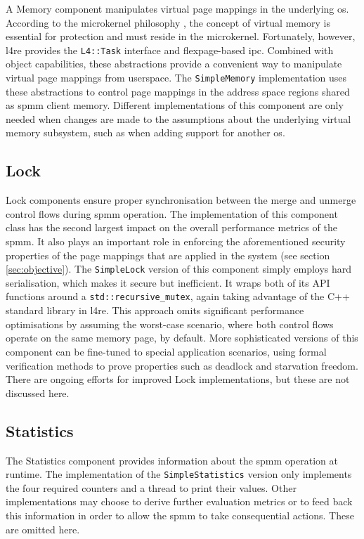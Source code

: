 A Memory component manipulates virtual page mappings in the underlying \ac{os}.
According to the microkernel philosophy \cite{liedtke1995}, the concept of virtual memory is essential for protection and must reside in the microkernel.
Fortunately, however, \ac{l4re} provides the \texttt{L4::Task} interface and flexpage-based \ac{ipc}.
Combined with object capabilities, these abstractions provide a convenient way to manipulate virtual page mappings from userspace.
The \texttt{SimpleMemory} implementation uses these abstractions to control page mappings in the address space regions shared as \ac{spmm} client memory.
Different implementations of this component are only needed when changes are made to the assumptions about the underlying virtual memory subsystem, such as when adding support for another \ac{os}.

\subsection*{Lock}
\label{subsec:lock}

Lock components ensure proper synchronisation between the merge and unmerge control flows during \ac{spmm} operation.
The implementation of this component class has the second largest impact on the overall performance metrics of the \ac{spmm}.
It also plays an important role in enforcing the aforementioned security properties of the page mappings that are applied in the system (see section \ref{sec:objective}).
The \texttt{SimpleLock} version of this component simply employs hard serialisation, which makes it secure but inefficient.
It wraps both of its API functions around a \texttt{std::recursive\_mutex}, again taking advantage of the C++ standard library in \ac{l4re}.
This approach omits significant performance optimisations by assuming the worst-case scenario, where both control flows operate on the same memory page, by default.
More sophisticated versions of this component can be fine-tuned to special application scenarios, using formal verification methods to prove properties such as deadlock and starvation freedom.
There are ongoing efforts for improved Lock implementations, but these are not discussed here.

\subsection*{Statistics}
\label{subsec:statistics}

The Statistics component provides information about the \ac{spmm} operation at runtime.
The implementation of the \texttt{SimpleStatistics} version only implements the four required counters and a thread to print their values.
Other implementations may choose to derive further evaluation metrics or to feed back this information in order to allow the \ac{spmm} to take consequential actions.
These are omitted here.

